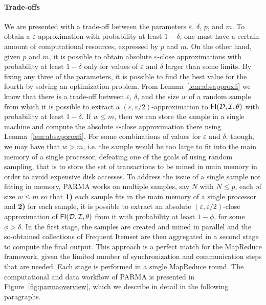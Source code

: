 \paragraph*{Trade-offs} We are presented with a trade-off between the parameters
$\varepsilon$, $\delta$, $p$, and $m$. To obtain a $\varepsilon$-approximation
with probability at least $1-\delta$, one must have a certain amount of computational resources,
expressed by $p$ and $m$. On the other hand, given $p$ and $m$, it is possible
to obtain absolute $\varepsilon$-close approximations with probability at least
$1-\delta$ only for values of $\varepsilon$ and $\delta$ larger than some
limits. By fixing any three of the parameters, it is possible to find the
best value for the fourth by solving an optimization problem. From
Lemma~\ref{lem:absapproxfi} we know that there is a trade-off between
$\varepsilon$, $\delta$, and the size $w$ of a random sample from which it is
possible to extract a $(\varepsilon,\varepsilon/2)$-approximation to
$\mathsf{FI}({\cal D},{\cal I},\theta)$ with probability at least $1-\delta$. If $w\le m$, then
we can store the sample in a single machine and compute the absolute
$\varepsilon$-close approximation there using Lemma~\ref{lem:absapproxfi}. For some
combinations of values for $\varepsilon$ and $\delta$, though, we may have that
$w>m$, i.e. the sample would be too large to fit into the main memory of a single
processor, defeating one of the goals of using random sampling, that is to store
the set of transactions to be mined in main memory in order to avoid expensive disk
accesses. To address the issue of a single sample not fitting in memory, PARMA
works on multiple samples, say $N$ with $N\le p$, each of size $w\le m$ so that
{\bf 1)} each sample fits in the main memory of a single processor and {\bf 2)}
for each sample, it is possible to extract an absolute
$(\varepsilon,\varepsilon/2)$-close approximation of $\mathsf{FI}({\cal D},{\cal I},\theta)$ from it
with probability at least $1-\phi$, for some $\phi>\delta$. In the first stage,
the samples are created and mined in parallel and the so-obtained collections of
Frequent Itemset are then aggregated in a second stage to compute the final output. This
approach is a perfect match for the MapReduce framework, given the limited
number of synchronization and
communication steps that are needed. Each
stage is performed in a single MapReduce round. The computational and data
workflow of PARMA is presented in Figure~\ref{fig:parmaoverview}, which we
describe in detail in the following paragraphs.

